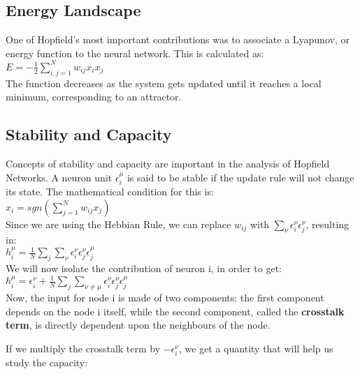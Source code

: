 \subsection{Energy Landscape}

One of Hopfield's most important contributions was to associate a Lyapunov, or energy function to the neural network. This is calculated as:\\

\( E = -\frac{1}{2} \sum_{i,j=1}^{N}w_{ij}x_{i}x_{j} \)\\

The function decreases as the system gets updated until it reaches a local minimum, corresponding to an attractor. 

\subsection{Stability and Capacity}

Concepts of stability and capacity are important in the analysis of Hopfield Networks. A neuron unit \( \epsilon_{i}^{\mu}\) is said to be stable if the update rule will not change its state. The mathematical condition for this is:\\

 \(x_{i} = sgn(\sum_{j=1}^{N}w_{ij}x_{j}) \)\\

Since we are using the Hebbian Rule, we can replace \(w_{ij}\) with
\(\sum_{\nu}\epsilon_{i}^{\nu}\epsilon_{j}^{\nu}\), resulting in:\\

\( h_{i}^{\mu} = \frac{1}{N}\sum_{j} \sum_{\nu} \epsilon_{i}^{\nu}
						 \epsilon_{j}^{\nu}
						 \epsilon_{j}^{\mu}\)\\
 
 We will now isolate the contribution of neuron i, in order to get:\\
 
\( h_{i}^{\mu} = \epsilon_{i}^{\nu} + \frac{1}{N}\sum_{j} \sum_{\nu\neq\mu} 			 					 \epsilon_{i}^{\nu}
						 \epsilon_{j}^{\nu}
						 \epsilon_{j}^{\mu}\)\\
 
 Now, the input for node i is made of two components: the first component depends on the node i itself, while the second component, called the \textbf{crosstalk term}, is directly dependent upon the neighbours of the node. 
 
 If we multiply the crosstalk term by \(-\epsilon_{i}^{\nu}\),  we get a quantity that will help us study the capacity:\\
 
